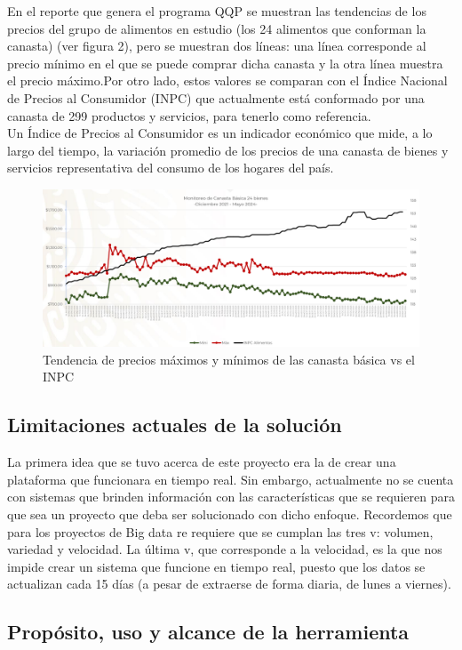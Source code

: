 \documentclass{article}
\begin{document}
En el reporte que genera el programa QQP se muestran las tendencias de los precios del grupo de alimentos en estudio (los 24 alimentos que conforman la canasta) (ver figura 2), pero se muestran dos líneas: una línea corresponde al precio mínimo en el que se puede comprar dicha canasta y la otra línea muestra el precio máximo.Por otro lado, estos valores se comparan con el Índice Nacional de Precios al Consumidor (INPC) que actualmente está conformado por una canasta de 299 productos y servicios, para tenerlo como referencia.\\

Un Índice de Precios al Consumidor es un indicador económico que mide, a lo largo del tiempo, la variación promedio de los precios de una canasta de bienes y servicios representativa del consumo de los hogares del país.

\begin{figure}[h]
\centering
\includegraphics[width=0.7\linewidth]{Reports/images/Tendencia.png}
\caption{\label{fig:Canasta}Tendencia de precios máximos y mínimos de las canasta básica vs el INPC}
\end{figure} 

\newpage
\subsection{Limitaciones actuales de la solución}

La primera idea que se tuvo acerca de este proyecto era la de crear una plataforma que funcionara en tiempo real. Sin embargo, actualmente no se cuenta con sistemas que brinden información con las características que se requieren para que sea un proyecto que deba ser solucionado con dicho enfoque. Recordemos que para los proyectos de Big data re requiere que se cumplan las tres v: volumen, variedad y velocidad. La última v, que corresponde a la velocidad, es la que nos impide crear un sistema que funcione en tiempo real, puesto que los datos se actualizan cada 15 días (a pesar de extraerse de forma diaria, de lunes a viernes). 

\subsection{Propósito, uso y alcance de la herramienta}
    
\end{document}
